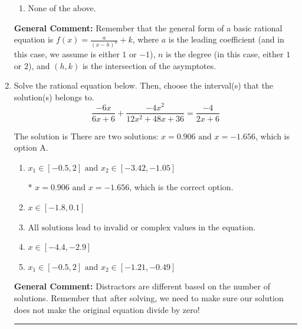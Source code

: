 \documentclass{extbook}[14pt]
\newcommand{\litem}[1]{\item #1

\rule{\textwidth}{0.4pt}}
\begin{document}
\begin{enumerate}
{\begin{enumerate}[label=\Alph*.]
\begin{multicols}{2}
\end{multicols}\item None of the above.\end{enumerate}
\textbf{General Comment:} Remember that the general form of a basic rational equation is $ f(x) = \frac{a}{(x-h)^n} + k$, where $a$ is the leading coefficient (and in this case, we assume is either $1$ or $-1$), $n$ is the degree (in this case, either $1$ or $2$), and $(h, k)$ is the intersection of the asymptotes.
}
\litem{
Solve the rational equation below. Then, choose the interval(s) that the solution(s) belongs to.
\[ \frac{-6x}{6x + 6} + \frac{-4x^{2}}{12x^{2} +48 x + 36} = \frac{-4}{2x + 6} \]

The solution is \( \text{There are two solutions: } x = 0.906 \text{ and } x = -1.656 \), which is option A.\begin{enumerate}[label=\Alph*.]
\item \( x_1 \in [-0.5, 2] \text{ and } x_2 \in [-3.42,-1.05] \)

* $x = 0.906 \text{ and } x = -1.656$, which is the correct option.
\item \( x \in [-1.8,0.1] \)


\item \( \text{All solutions lead to invalid or complex values in the equation.} \)


\item \( x \in [-4.4,-2.9] \)


\item \( x_1 \in [-0.5, 2] \text{ and } x_2 \in [-1.21,-0.49] \)


\end{enumerate}

\textbf{General Comment:} Distractors are different based on the number of solutions. Remember that after solving, we need to make sure our solution does not make the original equation divide by zero!
}
\end{enumerate}
\end{document}
